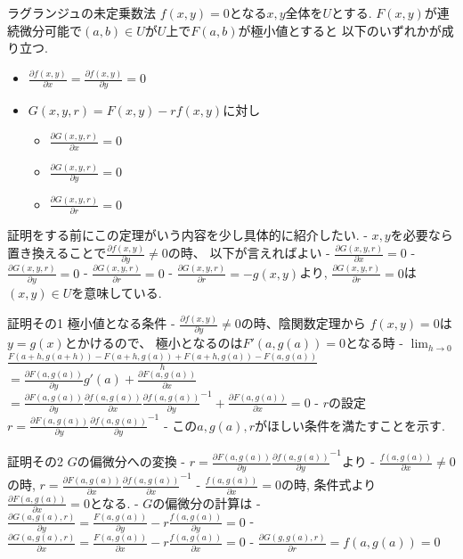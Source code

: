 \begin{thm}
ラグランジュの未定乗数法
$f(x ,y) = 0$となる$x, y$全体を$U$とする.
$F(x, y)$が連続微分可能で$(a, b) \in U$が$U$上で$F(a, b)$が極小値とすると
  以下のいずれかが成り立つ.
 \begin{itemize}
  \item $\frac{\partial f(x, y)}{\partial x} = \frac{\partial f(x, y)}{\partial y} = 0$
  \item $G(x, y, r) = F(x, y) - r f(x, y)$に対し
  \begin{itemize}
    \item $\frac{\partial G(x, y, r)}{\partial x} = 0$
    \item $\frac{\partial G(x, y, r)}{\partial y} = 0$
    \item $\frac{\partial G(x, y, r)}{\partial r} = 0$
  \end{itemize}
 \end{itemize}
\end{thm}
証明をする前にこの定理がいう内容を少し具体的に紹介したい.
- $x, y$を必要なら置き換えることで$\frac{\partial f(x, y)}{\partial y} \neq 0$の時、
  以下が言えればよい
  - $\frac{\partial G(x, y, r)}{\partial x} = 0$
  - $\frac{\partial G(x, y, r)}{\partial y} = 0$
  - $\frac{\partial G(x, y, r)}{\partial r} = 0$
- $\frac{\partial G(x, y, r)}{\partial r} = - g(x, y)$より,
  $\frac{\partial G(x, y, r)}{\partial r} = 0$は$(x ,y) \in U$を意味している.


証明その1 極小値となる条件
- $\frac{\partial f(x, y)}{\partial y} \neq 0$の時、陰関数定理から
  $f(x, y) = 0$は$y = g(x)$とかけるので、
  極小となるのは$F'(a, g(a)) = 0$となる時
- $\displaystyle \lim_{h \to 0}$ $\frac{F(a + h, g(a+h)) - F(a+h, g(a)) + F(a+h, g(a)) - F(a,g(a))}{h}$
  $= \frac{\partial F(a, g(a))}{\partial y} g'(a) + \frac{\partial F(a, g(a))}{\partial x}$
  $= \frac{\partial F(a, g(a))}{\partial y} \frac{\partial f(a, g(a))}{\partial x} \frac{\partial f(a, g(a))}{\partial y}^{-1} + \frac{\partial F(a, g(a))}{\partial x} = 0$
- $r$の設定
  $r= \frac{\partial F(a, g(a))}{\partial y} \frac{\partial f(a, g(a))}{\partial y}^{-1}$
- この$a, g(a), r$がほしい条件を満たすことを示す.


証明その2 $G$の偏微分への変換
- $r= \frac{\partial F(a, g(a))}{\partial y} \frac{\partial f(a, g(a))}{\partial y}^{-1}$より
  - $\frac{f(a, g(a))}{\partial x} \neq 0$の時, $r= \frac{\partial F(a, g(a))}{\partial x} \frac{\partial f(a, g(a))}{\partial x}^{-1}$
  - $\frac{f(a, g(a))}{\partial x} = 0$の時, 条件式より$\frac{\partial F(a, g(a))}{\partial x} = 0$となる.
- $G$の偏微分の計算は
  - $\frac{\partial G(a, g(a), r)}{\partial y} = \frac{F(a, g(a))}{\partial y} - r \frac{f(a, g(a))}{\partial y} = 0$
  - $\frac{\partial G(a, g(a), r)}{\partial x} = \frac{F(a, g(a))}{\partial x} - r \frac{f(a, g(a))}{\partial x} = 0$
  - $\frac{\partial G(g, g(a), r)}{\partial r} = f(a, g(a)) = 0$

